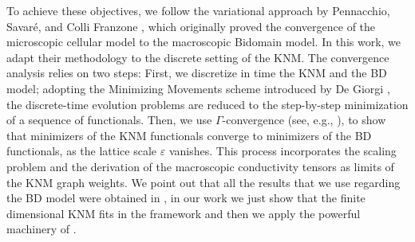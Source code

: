 \documentclass[a4paper,11pt]{article}
\theoremstyle{definition}
\numberwithin{equation}{section}
\newcommand{\e}{\varepsilon}
\begin{document}
To achieve these objectives, we follow the variational approach by Pennacchio, Savar\'e, and Colli Franzone \cite{PSCF05}, which originally proved the convergence of the microscopic cellular model to the macroscopic Bidomain model. In this work, we adapt their methodology to the discrete setting of the KNM. The convergence analysis relies on two steps: First, we discretize in time the KNM and the BD model; adopting the Minimizing Movements scheme introduced by De Giorgi \cite{AGS05, DG93}, the discrete-time evolution problems are reduced to the step-by-step minimization of a sequence of functionals. Then, we use $\Gamma$-convergence (see, e.g., \cite{DM93}), to show that minimizers of the KNM functionals converge to minimizers of the BD functionals, as the lattice scale $\e$ vanishes. This process incorporates the scaling problem and the derivation of the macroscopic conductivity tensors as limits of the KNM graph weights. We point out that all the results that we use regarding the BD model were obtained in \cite{CFS02,PSCF05}, in our work we just show that the finite dimensional KNM fits in the framework and then we apply the powerful machinery of \cite{PSCF05}. 
\end{document}
